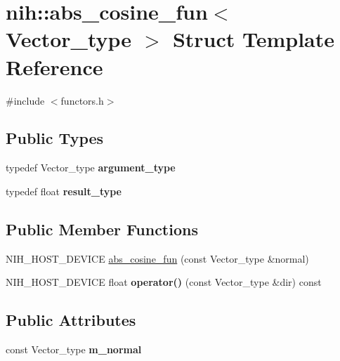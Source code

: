 \hypertarget{structnih_1_1abs__cosine__fun}{
\section{nih\-:\-:abs\-\_\-cosine\-\_\-fun$<$ \-Vector\-\_\-type $>$ \-Struct \-Template \-Reference}
\label{structnih_1_1abs__cosine__fun}
}


{\ttfamily \#include $<$functors.\-h$>$}

\subsection*{\-Public \-Types}
\begin{DoxyCompactItemize}
\item 
\hypertarget{structnih_1_1abs__cosine__fun_a4e74ec8f03c043f155b85ca66f81516b}{
typedef \-Vector\-\_\-type {\bfseries argument\-\_\-type}}
\label{structnih_1_1abs__cosine__fun_a4e74ec8f03c043f155b85ca66f81516b}

\item 
\hypertarget{structnih_1_1abs__cosine__fun_a374d29f99c7b8fc42cc34356fff76e7d}{
typedef float {\bfseries result\-\_\-type}}
\label{structnih_1_1abs__cosine__fun_a374d29f99c7b8fc42cc34356fff76e7d}

\end{DoxyCompactItemize}
\subsection*{\-Public \-Member \-Functions}
\begin{DoxyCompactItemize}
\item 
\-N\-I\-H\-\_\-\-H\-O\-S\-T\-\_\-\-D\-E\-V\-I\-C\-E \hyperlink{structnih_1_1abs__cosine__fun_a9522a3b7785ea2f28b9446471ae7a9d7}{abs\-\_\-cosine\-\_\-fun} (const \-Vector\-\_\-type \&normal)
\item 
\hypertarget{structnih_1_1abs__cosine__fun_a16730fb31541444c43c6bdcc4efa3fa9}{
\-N\-I\-H\-\_\-\-H\-O\-S\-T\-\_\-\-D\-E\-V\-I\-C\-E float {\bfseries operator()} (const \-Vector\-\_\-type \&dir) const }
\label{structnih_1_1abs__cosine__fun_a16730fb31541444c43c6bdcc4efa3fa9}

\end{DoxyCompactItemize}
\subsection*{\-Public \-Attributes}
\begin{DoxyCompactItemize}
\item 
\hypertarget{structnih_1_1abs__cosine__fun_ae1f3a6e71fd31c1ffbcd6553cf5a6dd1}{
const \-Vector\-\_\-type {\bfseries m\-\_\-normal}}
\label{structnih_1_1abs__cosine__fun_ae1f3a6e71fd31c1ffbcd6553cf5a6dd1}

\end{DoxyCompactItemize}


